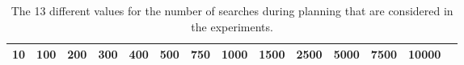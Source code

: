 \begin{table}[htbp]
\footnotesize
\centering
\centerfloat
\setlength{\tabcolsep}{5pt}
\begin{tabular}{cccccccccccccc}
\toprule
10 & 100 & 200 & 300 & 400 & 500 & 750 & 1000 & 1500 & 2500 & 5000 & 7500 & 10000 \\ \bottomrule
\end{tabular}
\caption[Values for the number of searches in experiment]{The 13 different values for the number of searches during planning that are considered in the experiments.}
\label{tab:num_searches}
\end{table} 